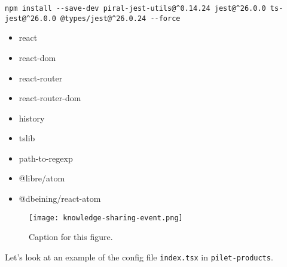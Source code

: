 \begin{lstlisting}[caption={}]
  npm install --save-dev piral-jest-utils@^0.14.24 jest@^26.0.0 ts-jest@^26.0.0 @types/jest@^26.0.24 --force 
\end{lstlisting}

\begin{itemize}
    \item react
    \item react-dom
    \item react-router
    \item react-router-dom
    \item history
    \item tslib
    \item path-to-regexp
    \item @libre/atom
    \item @dbeining/react-atom
    
\end{itemize}

\begin{figure}[h!]
  \centering
  \captionsetup{justification=centering}
  \texttt{[image: knowledge-sharing-event.png]}
  \caption{Caption for this figure.}
  \label{fig:1}
\end{figure}


Let’s look at an example of the config file \verb|index.tsx| in \verb|pilet-products|.